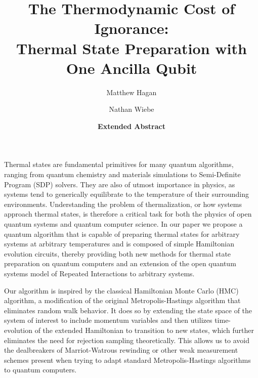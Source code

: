 \documentclass[11pt]{article}
\newcommand{\bigotilde}[1]{\widetilde{O} \left( #1 \right)}
\begin{document}
\title{The Thermodynamic Cost of Ignorance:\\ Thermal State Preparation with One Ancilla Qubit}

\author[1]{Matthew Hagan}
\author[1]{Nathan Wiebe}

\date{\textbf{Extended Abstract}}
\maketitle
Thermal states are fundamental primitives for many quantum algorithms, ranging from quantum chemistry and materials simulations to Semi-Definite Program (SDP) solvers. They are also of utmost importance in physics, as systems tend to generically equilibrate to the temperature of their surrounding environments. Understanding the problem of thermalization, or how systems approach thermal states, is therefore a critical task for both the physics of open quantum systems and quantum computer science. In our paper we propose a quantum algorithm that is capable of preparing thermal states for arbitrary systems at arbitrary temperatures and is composed of simple Hamiltonian evolution circuits, thereby providing both new methods for thermal state preparation on quantum computers and an extension of the open quantum systems model of Repeated Interactions to arbitrary systems. 


Our algorithm is inspired by the classical Hamiltonian Monte Carlo (HMC) algorithm, a modification of the original Metropolis-Hastings algorithm that eliminates random walk behavior. It does so by extending the state space of the system of interest to include momentum variables and then utilizes time-evolution of the extended Hamiltonian to transition to new states, which further eliminates the need for rejection sampling theoretically. This allows us to avoid the dealbreakers of Marriot-Watrous rewinding \cite{temme2011} or other weak measurement schemes \cite{jiang2024quantummetropolissamplingweak} present when trying to adapt standard Metropolis-Hastings algorithms to quantum computers.
\end{document}
